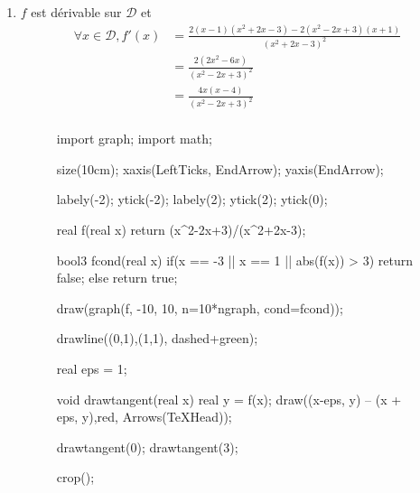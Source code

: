 \begin{exm}
\begin{enumerate}
		\item $f$ est dérivable sur $\mathcal{D}$ et 
			\begin{align*}
				\forall x \in \mathcal{D}, f'(x) &= \frac{2(x-1)(x^2+2x-3) - 2(x^2-2x+3)(x+1)}{(x^2+2x-3)^2}\\
				&= \frac{2(2x^2 - 6x)}{(x^2-2x+3)^2} \\
				&= \frac{4x(x-4)}{(x^2-2x+3)^2} \\
			\end{align*}
			\begin{center}
			\end{center}

			\begin{figure}[H]
				\centering
				\begin{asy}
					import graph;
					import math;

					size(10cm);
					xaxis(LeftTicks, EndArrow);
					yaxis(EndArrow);

					labely(-2); ytick(-2);
					labely(2); ytick(2);
					ytick(0);

					real f(real x) {return (x^2-2x+3)/(x^2+2x-3);}

					bool3 fcond(real x) {
						if(x == -3 || x == 1 || abs(f(x)) > 3)
							return false;
						else
							return true;
					}

					draw(graph(f, -10, 10, n=10*ngraph, cond=fcond));

					drawline((0,1),(1,1), dashed+green);

					real eps = 1;

					void drawtangent(real x) {real y = f(x); draw((x-eps, y) -- (x + eps, y),red, Arrows(TeXHead)); }

					drawtangent(0);
					drawtangent(3);

					crop();
				\end{asy}
			\end{figure}
	\end{enumerate}
\end{exm}


